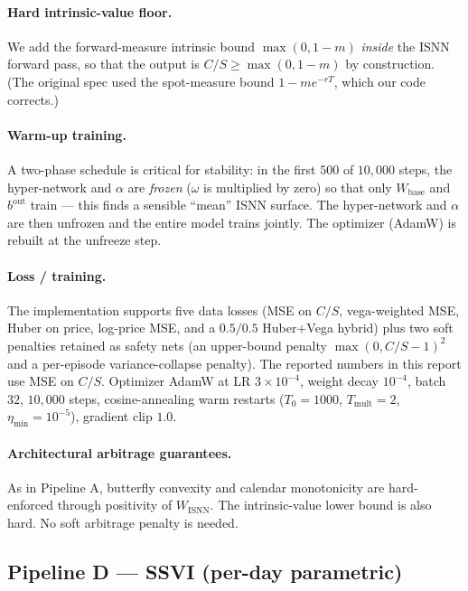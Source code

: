 \documentclass[11pt,a4paper]{article}
\begin{document}
\paragraph{Hard intrinsic-value floor.} We add the forward-measure
intrinsic bound $\max(0, 1 - m)$ \emph{inside} the ISNN forward pass, so
that the output is $C/S \ge \max(0, 1 - m)$ by construction. (The original
spec used the spot-measure bound $1 - m e^{-rT}$, which our code corrects.)

\paragraph{Warm-up training.} A two-phase schedule is critical for
stability: in the first $500$ of $10{,}000$ steps, the hyper-network and
$\alpha$ are \emph{frozen} ($\omega$ is multiplied by zero) so that only
$W_{\mathrm{base}}$ and $b^{\mathrm{out}}$ train --- this finds a sensible
``mean'' ISNN surface. The hyper-network and $\alpha$ are then unfrozen
and the entire model trains jointly. The optimizer (AdamW) is rebuilt at
the unfreeze step.

\paragraph{Loss / training.} The implementation supports five data losses
(MSE on $C/S$, vega-weighted MSE, Huber on price, log-price MSE, and a
$0.5/0.5$ Huber+Vega hybrid) plus two soft penalties retained as safety
nets (an upper-bound penalty $\max(0, C/S - 1)^2$ and a per-episode
variance-collapse penalty). The reported numbers in this report use MSE
on $C/S$. Optimizer AdamW at LR $3\times 10^{-4}$, weight decay $10^{-4}$,
batch $32$, $10{,}000$ steps, cosine-annealing warm restarts
($T_0{=}1000$, $T_{\mathrm{mult}}{=}2$, $\eta_{\min}{=}10^{-5}$), gradient
clip $1.0$.

\paragraph{Architectural arbitrage guarantees.} As in Pipeline A, butterfly
convexity and calendar monotonicity are hard-enforced through positivity
of $W_{\mathrm{ISNN}}$. The intrinsic-value lower bound is also hard. No
soft arbitrage penalty is needed.

\subsection{Pipeline D --- SSVI (per-day parametric)}
\label{sec:pipeD}
\end{document}
